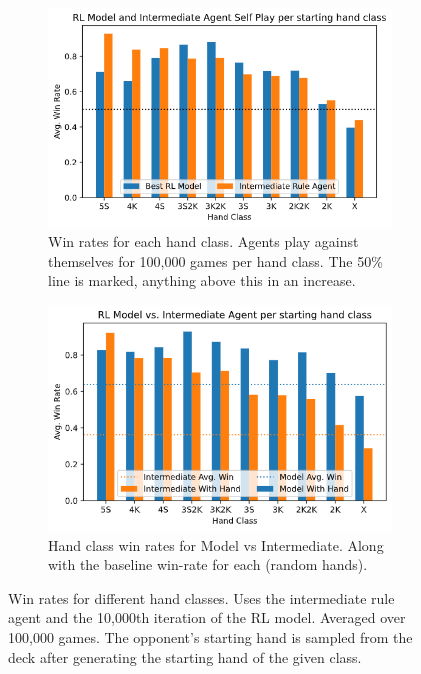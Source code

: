 \documentclass[../main.tex]{subfiles}
\begin{document}
\begin{figure}
    \centering
    \begin{subfigure}[t]{0.49\textwidth}
        \centering
        \includegraphics[width=\textwidth,keepaspectratio]{images/results/handclasses.png}
        \caption{Win rates for each hand class. Agents play against themselves for 100,000 games per hand class. The 50\% line is marked, anything above this in an increase.}
        \label{fig:handclass-vs-self}
    \end{subfigure}
    \hfill
    \begin{subfigure}[t]{0.49\textwidth}
        \centering
        \includegraphics[width=\textwidth,keepaspectratio]{images/results/handclasses_model_vs_rules.png}
        \caption{Hand class win rates for Model vs Intermediate. Along with the baseline win-rate for each (random hands).}
        \label{fig:handclass-int-vs-model}
    \end{subfigure}
    \label{fig:handclass-winrates}
    \caption{Win rates for different hand classes. Uses the intermediate rule agent and the 10,000th iteration of the RL model. Averaged over 100,000 games. The opponent's starting hand is sampled from the deck after generating the starting hand of the given class.}
\end{figure}
\end{document}

